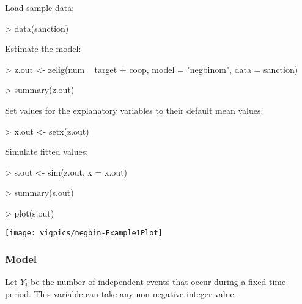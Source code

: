 Load sample data:  
\begin{Schunk}
\begin{Sinput}
> data(sanction)
\end{Sinput}
\end{Schunk}
Estimate the model:  
\begin{Schunk}
\begin{Sinput}
> z.out <- zelig(num ~ target + coop, model = "negbinom", data = sanction)
\end{Sinput}
\end{Schunk}
\begin{Schunk}
\begin{Sinput}
> summary(z.out)
\end{Sinput}
\end{Schunk}
Set values for the explanatory variables to their default mean values:  
\begin{Schunk}
\begin{Sinput}
> x.out <- setx(z.out)
\end{Sinput}
\end{Schunk}
Simulate fitted values:  
\begin{Schunk}
\begin{Sinput}
> s.out <- sim(z.out, x = x.out)
\end{Sinput}
\end{Schunk}
\begin{Schunk}
\begin{Sinput}
> summary(s.out)
\end{Sinput}
\end{Schunk}
\begin{center}
\begin{Schunk}
\begin{Sinput}
> plot(s.out)
\end{Sinput}
\end{Schunk}
\texttt{[image: vigpics/negbin-Example1Plot]}
\end{center}
\subsubsection{Model}
Let $Y_i$ be the number of independent events that occur during a
fixed time period. This variable can take any non-negative integer value.

